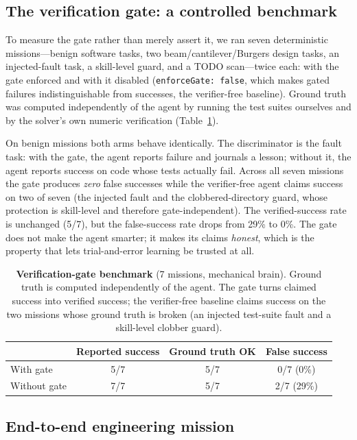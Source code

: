 \documentclass[11pt,a4paper]{article}
\begin{document}
\subsection{The verification gate: a controlled benchmark}

To measure the gate rather than merely assert it, we ran seven deterministic
missions---benign software tasks, two beam/cantilever/Burgers design tasks,
an injected-fault task, a skill-level guard, and a TODO scan---twice each:
with the gate enforced and with it disabled (\texttt{enforceGate: false},
which makes gated failures indistinguishable from successes, the
verifier-free baseline). Ground truth was computed independently of the
agent by running the test suites ourselves and by the solver's own numeric
verification (Table~\ref{tab:gate}).

On benign missions both arms behave identically. The discriminator is the
fault task: with the gate, the agent reports failure and journals a lesson;
without it, the agent reports success on code whose tests actually fail.
Across all seven missions the gate produces \emph{zero} false successes
while the verifier-free agent claims success on two of seven (the injected
fault and the clobbered-directory guard, whose protection is skill-level
and therefore gate-independent). The verified-success rate is unchanged
(5/7), but the false-success rate drops from 29\% to 0\%. The gate does not
make the agent smarter; it makes its claims \emph{honest}, which is the
property that lets trial-and-error learning be trusted at all.

\begin{table}[t]
\centering
\small
\begin{tabular}{lccc}
\toprule
 & Reported success & Ground truth OK & False success \\
\midrule
With gate & 5/7 & 5/7 & 0/7 (0\%) \\
Without gate & 7/7 & 5/7 & 2/7 (29\%) \\
\bottomrule
\end{tabular}
\caption{\textbf{Verification-gate benchmark} (7 missions, mechanical brain).
Ground truth is computed independently of the agent. The gate turns claimed
success into verified success; the verifier-free baseline claims success on
the two missions whose ground truth is broken (an injected test-suite fault
and a skill-level clobber guard).}
\label{tab:gate}
\end{table}

\subsection{End-to-end engineering mission}
\end{document}
